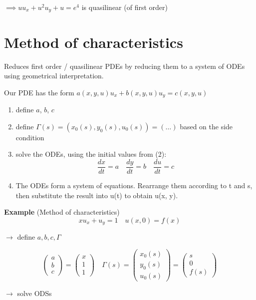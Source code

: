 $\implies uu_x + u^2u_y + u = e^4$ is quasilinear (of first order)

\section{Method of characteristics}
Reduces first order / quasilinear PDEs by reducing them to a system of ODEs using geometrical interpretation.

\begin{recipe}
Our PDE has the form $a(x,y,u)u_x + b(x,y,u)u_y = c(x,y,u)$
\begin{enumerate}
 \item define $a$, $b$, $c$
 \item define $\varGamma(s) = (x_0(s), y_0(s), u_0(s)) = (\dots)$ based on the side condition
 \item solve the ODEs, using the initial values from (2):
 $$\frac{dx}{dt}=a \quad \frac{dy}{dt}=b \quad \frac{du}{dt}=c$$
 \item The ODEs form a system of equations. Rearrange them according to t and s, then substitute the result into u(t) to obtain u(x, y).
\end{enumerate}
\end{recipe}

\textbf{Example} (Method of characteristics)
$$xu_x+u_y = 1 \quad u(x,0)=f(x)$$

$\to$ define $a,b,c,\varGamma$

$$
\begin{pmatrix}
a\\b\\c
\end{pmatrix} = \begin{pmatrix}
x\\1\\1
\end{pmatrix} \quad \varGamma(s) = \begin{pmatrix}
x_{0}(s)\\y_{0}(s) \\u_{0}(s)
\end{pmatrix} = \begin{pmatrix}
s\\0\\f(s)
\end{pmatrix}
$$

$\to$ solve ODSs

